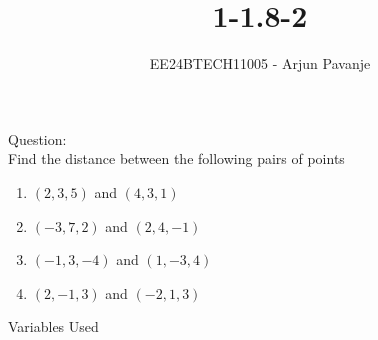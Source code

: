 \documentclass[journal]{IEEEtran}
\begin{document}

\vspace{3cm}

\title{1-1.8-2}
\author{EE24BTECH11005 - Arjun Pavanje
}
{\let\newpage\relax\maketitle}
Question:\\
Find the distance between the following pairs of points\\
\begin{enumerate}
	\item $(2,3,5)$ and $(4,3,1)$
	\item $(-3,7,2)$ and $(2,4,-1)$
	\item $(-1,3,-4)$ and $(1,-3,4)$
	\item $(2,-1,3)$ and $(-2,1,3)$
\end{enumerate}
\solution
\begin{table}[h!]    
  \centering
  
  \caption{Variables Used}
  \label{tab1-1.5-29}
\end{table}\\
\end{document}
